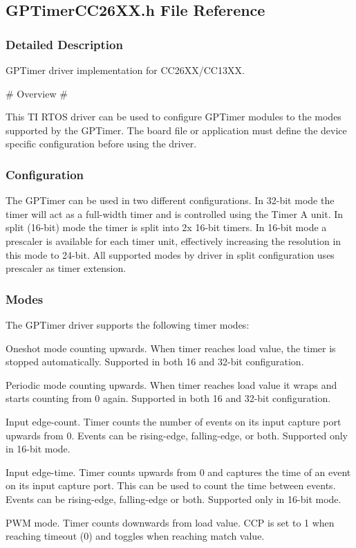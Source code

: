 \subsection{G\+P\+Timer\+C\+C26\+X\+X.\+h File Reference}
\label{_g_p_timer_c_c26_x_x_8h}


\subsubsection{Detailed Description}
G\+P\+Timer driver implementation for C\+C26\+X\+X/\+C\+C13\+X\+X. 



 \begin{DoxyVerb}# Overview #
\end{DoxyVerb}
 This T\+I R\+T\+O\+S driver can be used to configure G\+P\+Timer modules to the modes supported by the G\+P\+Timer. The board file or application must define the device specific configuration before using the driver. \subsubsection*{Configuration}

The G\+P\+Timer can be used in two different configurations. In 32-\/bit mode the timer will act as a full-\/width timer and is controlled using the Timer A unit. In split (16-\/bit) mode the timer is split into 2x 16-\/bit timers. In 16-\/bit mode a prescaler is available for each timer unit, effectively increasing the resolution in this mode to 24-\/bit. All supported modes by driver in split configuration uses prescaler as timer extension.

\subsubsection*{Modes}

The G\+P\+Timer driver supports the following timer modes\+:
\begin{DoxyItemize}
\item Oneshot mode counting upwards. When timer reaches load value, the timer is stopped automatically. Supported in both 16 and 32-\/bit configuration.
\item Periodic mode counting upwards. When timer reaches load value it wraps and starts counting from 0 again. Supported in both 16 and 32-\/bit configuration.
\item Input edge-\/count. Timer counts the number of events on its input capture port upwards from 0. Events can be rising-\/edge, falling-\/edge, or both. Supported only in 16-\/bit mode.
\item Input edge-\/time. Timer counts upwards from 0 and captures the time of an event on its input capture port. This can be used to count the time between events. Events can be rising-\/edge, falling-\/edge or both. Supported only in 16-\/bit mode.
\item P\+W\+M mode. Timer counts downwards from load value. C\+C\+P is set to 1 when reaching timeout (0) and toggles when reaching match value.
\end{DoxyItemize}

